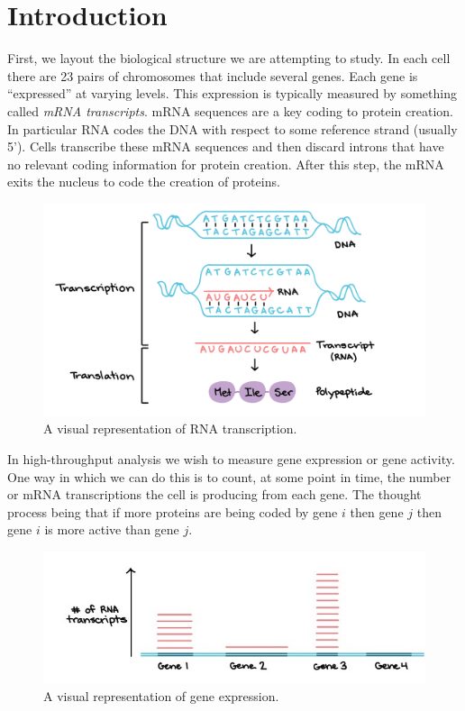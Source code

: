 \documentclass[11pt]{article}
\begin{document}
\section{Introduction } 

First, we layout the biological structure we are attempting to study. In each cell there are 23 pairs of chromosomes that include several genes. Each gene is ``expressed'' at varying levels. This expression is typically measured by something called \textit{mRNA transcripts}. mRNA sequences are a key coding to protein creation. In particular RNA codes the DNA with respect to some reference strand (usually 5'). Cells transcribe these mRNA sequences and then discard introns that have no relevant coding information for protein creation. After this step, the mRNA exits the nucleus to code the creation of proteins.
\begin{figure}[h!]
	\centering
	\includegraphics{transcription.png}
	\caption{A visual representation of RNA transcription.}
\end{figure}
In high-throughput analysis we wish to measure gene expression or gene activity. One way in which we can do this is to count, at some point in time, the number or mRNA transcriptions the cell is producing from each gene. The thought process being that if more proteins are being coded by gene $i$ then gene $j$ then gene $i$ is more active than gene $j$. 
\begin{figure}[h!]
	\centering
	\includegraphics[scale = 0.5]{gene_expression.jpg}
	\caption{A visual representation of gene expression.}
\end{figure}
\end{document}
